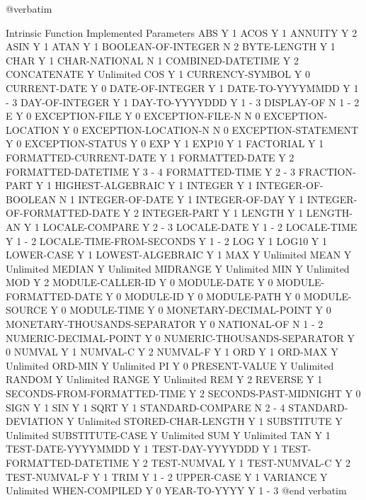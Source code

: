 @verbatim

Intrinsic Function		Implemented	Parameters
ABS				Y		1
ACOS				Y		1
ANNUITY				Y		2
ASIN				Y		1
ATAN				Y		1
BOOLEAN-OF-INTEGER		N		2
BYTE-LENGTH			Y		1
CHAR				Y		1
CHAR-NATIONAL			N		1
COMBINED-DATETIME		Y		2
CONCATENATE			Y		Unlimited
COS				Y		1
CURRENCY-SYMBOL			Y		0
CURRENT-DATE			Y		0
DATE-OF-INTEGER			Y		1
DATE-TO-YYYYMMDD		Y		1 - 3
DAY-OF-INTEGER			Y		1
DAY-TO-YYYYDDD			Y		1 - 3
DISPLAY-OF			N		1 - 2
E				Y		0
EXCEPTION-FILE			Y		0
EXCEPTION-FILE-N		N		0
EXCEPTION-LOCATION		Y		0
EXCEPTION-LOCATION-N		N		0
EXCEPTION-STATEMENT		Y		0
EXCEPTION-STATUS		Y		0
EXP				Y		1
EXP10				Y		1
FACTORIAL			Y		1
FORMATTED-CURRENT-DATE		Y		1
FORMATTED-DATE			Y		2
FORMATTED-DATETIME		Y		3 - 4
FORMATTED-TIME			Y		2 - 3
FRACTION-PART			Y		1
HIGHEST-ALGEBRAIC		Y		1
INTEGER				Y		1
INTEGER-OF-BOOLEAN		N		1
INTEGER-OF-DATE			Y		1
INTEGER-OF-DAY			Y		1
INTEGER-OF-FORMATTED-DATE	Y		2
INTEGER-PART			Y		1
LENGTH				Y		1
LENGTH-AN			Y		1
LOCALE-COMPARE			Y		2 - 3
LOCALE-DATE			Y		1 - 2
LOCALE-TIME			Y		1 - 2
LOCALE-TIME-FROM-SECONDS	Y		1 - 2
LOG				Y		1
LOG10				Y		1
LOWER-CASE			Y		1
LOWEST-ALGEBRAIC		Y		1
MAX				Y		Unlimited
MEAN				Y		Unlimited
MEDIAN				Y		Unlimited
MIDRANGE			Y		Unlimited
MIN				Y		Unlimited
MOD				Y		2
MODULE-CALLER-ID		Y		0
MODULE-DATE			Y		0
MODULE-FORMATTED-DATE		Y		0
MODULE-ID			Y		0
MODULE-PATH			Y		0
MODULE-SOURCE			Y		0
MODULE-TIME			Y		0
MONETARY-DECIMAL-POINT		Y		0
MONETARY-THOUSANDS-SEPARATOR	Y		0
NATIONAL-OF			N		1 - 2
NUMERIC-DECIMAL-POINT		Y		0
NUMERIC-THOUSANDS-SEPARATOR	Y		0
NUMVAL				Y		1
NUMVAL-C			Y		2
NUMVAL-F			Y		1
ORD				Y		1
ORD-MAX				Y		Unlimited
ORD-MIN				Y		Unlimited
PI				Y		0
PRESENT-VALUE			Y		Unlimited
RANDOM				Y		Unlimited
RANGE				Y		Unlimited
REM				Y		2
REVERSE				Y		1
SECONDS-FROM-FORMATTED-TIME	Y		2
SECONDS-PAST-MIDNIGHT		Y		0
SIGN				Y		1
SIN				Y		1
SQRT				Y		1
STANDARD-COMPARE		N		2 - 4
STANDARD-DEVIATION		Y		Unlimited
STORED-CHAR-LENGTH		Y		1
SUBSTITUTE			Y		Unlimited
SUBSTITUTE-CASE			Y		Unlimited
SUM				Y		Unlimited
TAN				Y		1
TEST-DATE-YYYYMMDD		Y		1
TEST-DAY-YYYYDDD		Y		1
TEST-FORMATTED-DATETIME		Y		2
TEST-NUMVAL			Y		1
TEST-NUMVAL-C			Y		2
TEST-NUMVAL-F			Y		1
TRIM				Y		1 - 2
UPPER-CASE			Y		1
VARIANCE			Y		Unlimited
WHEN-COMPILED			Y		0
YEAR-TO-YYYY			Y		1 - 3
@end verbatim

